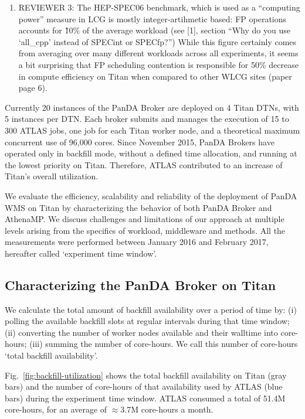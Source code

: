 \begin{enumerate}
    \item REVIEWER 3: The HEP-SPEC06 benchmark, which is used as a
    ``computing power'' measure in LCG is mostly integer-artihmetic based: FP
    operations accounts for \~10\% of the average workload (see [1], section
    ``Why do you use `all\_cpp' instead of SPECint or SPECfp?'') While this
    figure certainly comes from averaging over many different workloads
    across all experiments, it seems a bit surprising that FP scheduling
    contention is responsible for 50\% decrease in compute efficiency on
    Titan when compared to other WLCG sites (paper page 6).
\end{enumerate}
\fi

Currently 20 instances of the PanDA Broker are deployed on 4 Titan DTNs, with
5 instances per DTN\@. Each broker submits and manages the execution of 15 to
300 ATLAS jobs, one job for each Titan worker node, and a theoretical maximum
concurrent use of 96,000 cores. Since November 2015, PanDA Brokers have
operated only in backfill mode, without a defined time allocation, and
running at the lowest priority on Titan. Therefore, ATLAS contributed to an
increase of Titan's overall utilization.

We evaluate the efficiency, scalability and reliability of the deployment of
PanDA WMS on Titan by characterizing the behavior of both PanDA Broker and
AthenaMP\@. We discuss challenges and limitations of our approach at multiple
levels arising from the specifics of workload, middleware and methods. All
the measurements were performed between January 2016 and February 2017,
hereafter called `experiment time window'.

\subsection{Characterizing the PanDA Broker on Titan}\label{ssec:broker_titan}

We calculate the total amount of backfill availability over a period of time
by: (i) polling the available backfill slots at regular intervals during that
time window; (ii) converting the number of worker nodes available and their
walltime into core-hours; (iii) summing the number of core-hours. We call
this number of core-hours `total backfill availability'.

Fig.~\ref{fig:backfill-utilization} shows the total backfill availability on
Titan (gray bars) and the number of core-hours of that availability used by
ATLAS (blue bars) during the experiment time window. ATLAS consumed a total
of 51.4M core-hours, for an average of \(\approx\)3.7M core-hours a month.

